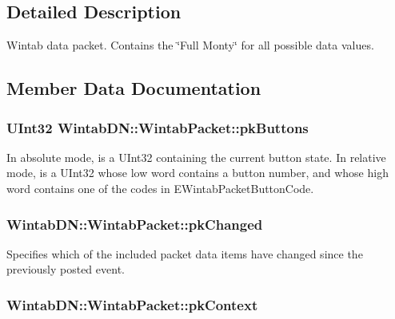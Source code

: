 \subsection{Detailed Description}
Wintab data packet. Contains the \char`\"{}Full Monty\char`\"{} for all possible data values. 

\subsection{Member Data Documentation}
\hypertarget{struct_wintab_d_n_1_1_wintab_packet_a069d68ce089ae275eb30fd4b2746ad97}{
\subsubsection[{pkButtons}]{\setlength{\rightskip}{0pt plus 5cm}UInt32 {\bf WintabDN::WintabPacket::pkButtons}}}
\label{struct_wintab_d_n_1_1_wintab_packet_a069d68ce089ae275eb30fd4b2746ad97}


In absolute mode, is a UInt32 containing the current button state. In relative mode, is a UInt32 whose low word contains a button number, and whose high word contains one of the codes in EWintabPacketButtonCode. 

\hypertarget{struct_wintab_d_n_1_1_wintab_packet_a5a6a3eaeed23e1898551cb42267a7167}{
\subsubsection[{pkChanged}]{ {\bf WintabDN::WintabPacket::pkChanged}}}
\label{struct_wintab_d_n_1_1_wintab_packet_a5a6a3eaeed23e1898551cb42267a7167}


Specifies which of the included packet data items have changed since the previously posted event. 

\hypertarget{struct_wintab_d_n_1_1_wintab_packet_a8e32af4bfcc46357c69ac501b756ac38}{
\subsubsection[{pkContext}]{ {\bf WintabDN::WintabPacket::pkContext}}}
\label{struct_wintab_d_n_1_1_wintab_packet_a8e32af4bfcc46357c69ac501b756ac38}



